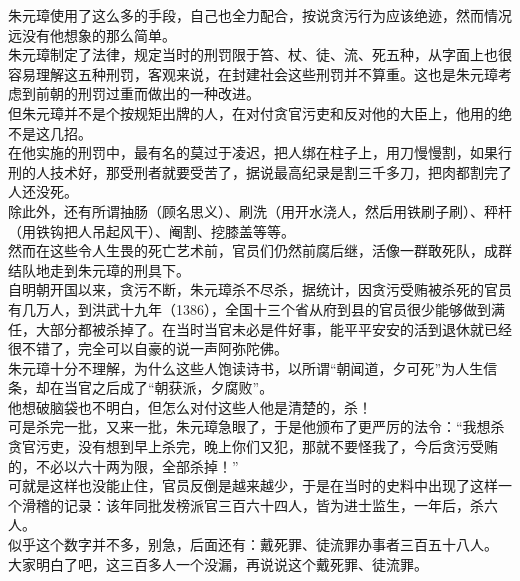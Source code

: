\begin{multicols}{\theparacolNo}
朱元璋使用了这么多的手段，自己也全力配合，按说贪污行为应该绝迹，然而情况远没有他想象的那么简单。\\

朱元璋制定了法律，规定当时的刑罚限于笞、杖、徒、流、死五种，从字面上也很容易理解这五种刑罚，客观来说，在封建社会这些刑罚并不算重。这也是朱元璋考虑到前朝的刑罚过重而做出的一种改进。\\

但朱元璋并不是个按规矩出牌的人，在对付贪官污吏和反对他的大臣上，他用的绝不是这几招。\\

在他实施的刑罚中，最有名的莫过于凌迟，把人绑在柱子上，用刀慢慢割，如果行刑的人技术好，那受刑者就要受苦了，据说最高纪录是割三千多刀，把肉都割完了人还没死。\\

除此外，还有所谓抽肠（顾名思义）、刷洗（用开水浇人，然后用铁刷子刷）、秤杆（用铁钩把人吊起风干）、阉割、挖膝盖等等。\\

然而在这些令人生畏的死亡艺术前，官员们仍然前腐后继，活像一群敢死队，成群结队地走到朱元璋的刑具下。\\

自明朝开国以来，贪污不断，朱元璋杀不尽杀，据统计，因贪污受贿被杀死的官员有几万人，到洪武十九年（1386），全国十三个省从府到县的官员很少能够做到满任，大部分都被杀掉了。在当时当官未必是件好事，能平平安安的活到退休就已经很不错了，完全可以自豪的说一声阿弥陀佛。\\

朱元璋十分不理解，为什么这些人饱读诗书，以所谓“朝闻道，夕可死”为人生信条，却在当官之后成了“朝获派，夕腐败”。\\

他想破脑袋也不明白，但怎么对付这些人他是清楚的，杀！\\

可是杀完一批，又来一批，朱元璋急眼了，于是他颁布了更严厉的法令：“我想杀贪官污吏，没有想到早上杀完，晚上你们又犯，那就不要怪我了，今后贪污受贿的，不必以六十两为限，全部杀掉！”\\

可就是这样也没能止住，官员反倒是越来越少，于是在当时的史料中出现了这样一个滑稽的记录：该年同批发榜派官三百六十四人，皆为进士监生，一年后，杀六人。\\

似乎这个数字并不多，别急，后面还有：戴死罪、徒流罪办事者三百五十八人。\\

大家明白了吧，这三百多人一个没漏，再说说这个戴死罪、徒流罪。\\


\end{multicols}

